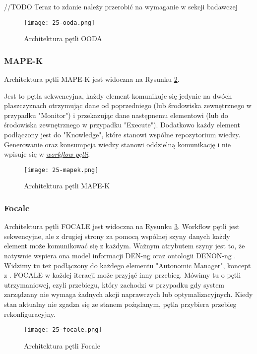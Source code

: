 //TODO Teraz to zdanie należy przerobić na wymaganie w sekcji badawczej

\begin{figure}[!h]
    \centering \texttt{[image: 25-ooda.png]}
    \caption{Architektura pętli OODA}\label{fig:25-ooda}
\end{figure}

\subsubsection{MAPE-K}
Architektura pętli MAPE-K \cite{kephart2003} jest widoczna na Rysunku \ref{fig:25-mapek}.

Jest to pętla sekwencyjna, każdy element komunikuje się jedynie na dwóch płaszczyznach otrzymując dane od poprzedniego (lub środowiska zewnętrznego w przypadku "Monitor") i przekazując dane następnemu elementowi (lub do środowiska zewnętrznego w przypadku "Execute"). Dodatkowo każdy element podłączony jest do "Knowledge", które stanowi wspólne repozytorium wiedzy. Generowanie oraz konsumpcja wiedzy stanowi oddzielną komunikację i nie wpisuje się w \hyperlink{def:workflow}{\textit{workflow pętli}}. 

\begin{figure}[!h]
    \centering \texttt{[image: 25-mapek.png]}
    \caption{Architektura pętli MAPE-K}\label{fig:25-mapek}
\end{figure}

\subsubsection{Focale}
Architektura pętli FOCALE \cite{strassner2007} jest widoczna na Rysunku \ref{fig:25-focale}. Workflow pętli jest sekwencyjne, ale z drugiej strony za pomocą wspólnej szyny danych każdy element może komunikować się z każdym. Ważnym atrybutem szyny jest to, że natywnie wspiera ona model informacji DEN-ng \cite{strassner2003} oraz ontologii DENON-ng \cite{strassner2007}. Widzimy tu też podłączony do każdego elementu "Autonomic Manager", koncept z \cite{kephart2003}. FOCALE w każdej iteracji może przyjąć inny przebieg. Mówimy tu o pętli utrzymaniowej, czyli przebiegu, który zachodzi w przypadku gdy system zarządzany nie wymaga żadnych akcji naprawczych lub optymalizacyjnych. Kiedy stan aktualny nie zgadza się ze stanem pożądanym, pętla przybiera przebieg rekonfiguracyjny. 

\begin{figure}[!h]
    \centering \texttt{[image: 25-focale.png]}
    \caption{Architektura pętli Focale}\label{fig:25-focale}
\end{figure}

